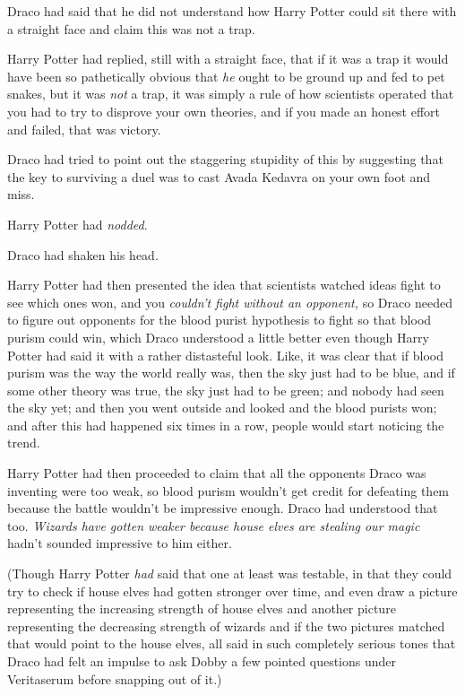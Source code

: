 Draco had said that he did not understand how Harry Potter could sit there with
a straight face and claim this was not a trap.

Harry Potter had replied, still with a straight face, that if it was a trap it
would have been so pathetically obvious that \emph{he} ought to be ground up
and fed to pet snakes, but it was \emph{not} a trap, it was simply a rule of
how scientists operated that you had to try to disprove your own theories, and
if you made an honest effort and failed, that was victory.

Draco had tried to point out the staggering stupidity of this by suggesting
that the key to surviving a duel was to cast Avada Kedavra on your own foot and
miss.

Harry Potter had \emph{nodded}.

Draco had shaken his head.

Harry Potter had then presented the idea that scientists watched ideas fight to
see which ones won, and you \emph{couldn't fight without an opponent,} so Draco
needed to figure out opponents for the blood purist hypothesis to fight so that
blood purism could win, which Draco understood a little better even though
Harry Potter had said it with a rather distasteful look. Like, it was clear
that if blood purism was the way the world really was, then the sky just had to
be blue, and if some other theory was true, the sky just had to be green; and
nobody had seen the sky yet; and then you went outside and looked and the blood
purists won; and after this had happened six times in a row, people would start
noticing the trend.

Harry Potter had then proceeded to claim that all the opponents Draco was
inventing were too weak, so blood purism wouldn't get credit for defeating them
because the battle wouldn't be impressive enough. Draco had understood that
too. \emph{Wizards have gotten weaker because house elves are stealing our
magic} hadn't sounded impressive to him either.

(Though Harry Potter \emph{had} said that one at least was testable, in that
they could try to check if house elves had gotten stronger over time, and even
draw a picture representing the increasing strength of house elves and another
picture representing the decreasing strength of wizards and if the two pictures
matched that would point to the house elves, all said in such completely
serious tones that Draco had felt an impulse to ask Dobby a few pointed
questions under Veritaserum before snapping out of it.)

